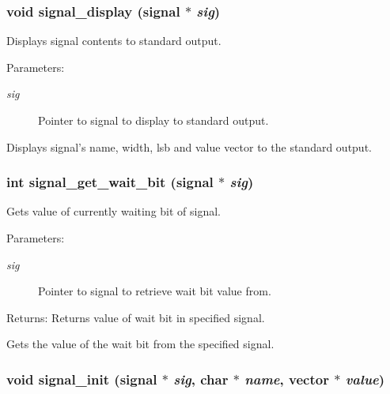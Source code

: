 \subsubsection{\setlength{\rightskip}{0pt plus 5cm}void signal\_\-display ({\bf signal} $\ast$ {\em sig})}\label{signal_8c_a11}


Displays signal contents to standard output. 

\begin{Desc}
\item[Parameters:]
\begin{description}
\item[{\em sig}]Pointer to signal to display to standard output.\end{description}
\end{Desc}
Displays signal's name, width, lsb and value vector to the standard output. 
\subsubsection{\setlength{\rightskip}{0pt plus 5cm}int signal\_\-get\_\-wait\_\-bit ({\bf signal} $\ast$ {\em sig})}\label{signal_8c_a8}


Gets value of currently waiting bit of signal. 

\begin{Desc}
\item[Parameters:]
\begin{description}
\item[{\em sig}]Pointer to signal to retrieve wait bit value from.\end{description}
\end{Desc}
\begin{Desc}
\item[Returns:]Returns value of wait bit in specified signal.\end{Desc}
Gets the value of the wait bit from the specified signal. 
\subsubsection{\setlength{\rightskip}{0pt plus 5cm}void signal\_\-init ({\bf signal} $\ast$ {\em sig}, char $\ast$ {\em name}, {\bf vector} $\ast$ {\em value})}\label{signal_8c_a2}


